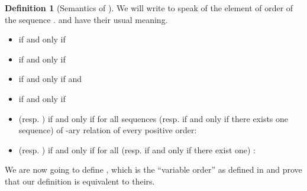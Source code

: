 \documentclass[a4paper,12pt]{article}
\theoremstyle{definition}
\newtheorem{definition}[theorem]{Definition}
\begin{document}
\begin{definition}[Semantics of \VO{}]
  We will write  to speak of the element of order  of
  the sequence .  
  and  have their usual meaning.
  \begin{itemize}
  \item  if and only if 
  \item  if and only if 
  \item 
    if and only if  and 
  \item  if and only if 
  \item  (resp.  ) if and only if for all sequences (resp. if
    and only if there exists one sequence)  of -ary relation of every
    positive order: 
  \item  (resp.  ) if and only if for all (resp. if and only if there exist
    one) : 

  \end{itemize}
\end{definition}
We are now going to define , which is the ``variable order'' as
defined in \cite{lauri} and prove that our definition is equivalent to
theirs.
\end{document}
